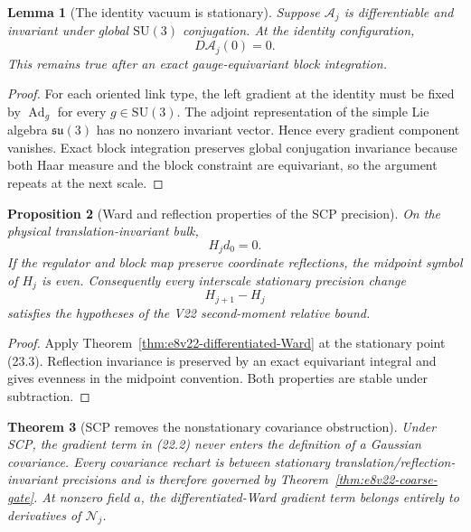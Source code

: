\documentclass[11pt,oneside]{book}
\newtheorem{theorem}{Theorem}[chapter]
\newtheorem{lemma}[theorem]{Lemma}
\newtheorem{proposition}[theorem]{Proposition}
\theoremstyle{definition}
\theoremstyle{remark}
\begin{document}
\begin{lemma}[The identity vacuum is stationary]
\label{lem:e8v23-stationary}
Suppose \(\mathcal A_j\) is differentiable and invariant under global
\(\mathrm{SU}(3)\) conjugation.  At the identity configuration,
\[
                         D\mathcal A_j(0)=0.                        \tag{23.3}
\]
This remains true after an exact gauge-equivariant block integration.
\end{lemma}

\begin{proof}
For each oriented link type, the left gradient at the identity must
be fixed by \(\operatorname{Ad}_g\) for every \(g\in\mathrm{SU}(3)\).
The adjoint representation of the simple Lie algebra
\(\mathfrak{su}(3)\) has no nonzero invariant vector.  Hence every
gradient component vanishes.  Exact block integration preserves
global conjugation invariance because both Haar measure and the block
constraint are equivariant, so the argument repeats at the next
scale.
\end{proof}

\begin{proposition}[Ward and reflection properties of the SCP
precision]
\label{prop:e8v23-SCP-Ward}
On the physical translation-invariant bulk,
\[
                         H_jd_0=0.                                 \tag{23.4}
\]
If the regulator and block map preserve coordinate reflections, the
midpoint symbol of \(H_j\) is even.  Consequently every interscale
stationary precision change
\[
                         H_{j+1}-H_j                               \tag{23.5}
\]
satisfies the hypotheses of the V22 second-moment relative bound.
\end{proposition}

\begin{proof}
Apply Theorem~\ref{thm:e8v22-differentiated-Ward} at the stationary
point (23.3).  Reflection invariance is preserved by an exact
equivariant integral and gives evenness in the midpoint convention.
Both properties are stable under subtraction.
\end{proof}

\begin{theorem}[SCP removes the nonstationary covariance obstruction]
\label{thm:e8v23-removal}
Under SCP, the gradient term in (22.2) never enters the definition of
a Gaussian covariance.  Every covariance rechart is between
stationary translation/reflection-invariant precisions and is
therefore governed by Theorem~\ref{thm:e8v22-coarse-gate}.  At
nonzero field \(a\), the differentiated-Ward gradient term belongs
entirely to derivatives of \(\mathcal N_j\).
\end{theorem}
\end{document}
